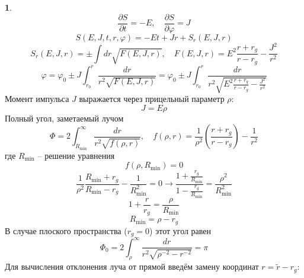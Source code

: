 \documentclass[12pt]{article}
\theoremstyle{definition}
\newtheorem{zad}{}[section]
\begin{document}
\begin{zad}
\begin{equation}
    \frac{\partial S}{\partial t}=-E, \quad \frac{\partial S}{\partial\varphi}=J
\end{equation}
\begin{equation}
    S(E,J,t,r,\varphi)=-Et+Jr+S_r(E,J,r)
\end{equation}
\begin{equation}
    S_r(E,J,r)=\pm\int dr\sqrt{F(E,J,r)},\quad F(E,J,r)=E^2\frac{r+r_g}{r-r_g}-\frac{J^2}{r^2}
\end{equation}
\begin{equation}
    \varphi=\varphi_0\pm J\int_{r_0}^r\frac{dr}{r^2\sqrt{F(E,J,r)}}=\varphi_0\pm J\int_{r_0}^r\frac{dr}{r^2\sqrt{E^2\frac{r+r_g}{r-r_g}-\frac{J^2}{r^2}}}
\end{equation}
Момент импульса $J$ выражается через прицельный параметр $\rho$:
\begin{equation}
    J=E\rho
\end{equation}
Полный угол, заметаемый лучом
\begin{equation}
    \Phi=2\int_{R_\text{min}}^\infty\frac{dr}{r^2\sqrt{f(\rho,r)}},\quad f(\rho,r)=\frac{1}{\rho^2}\left(\frac{r+r_g}{r-r_g}\right)-\frac{1}{r^2}
\end{equation}
где $R_\text{min}$ -- решение уравнения
\begin{equation}
    f(\rho,R_\text{min})=0
\end{equation}
\begin{equation}
    \frac{1}{\rho^2}\frac{R_\text{min}+r_g}{R_\text{min}-r_g}-\frac{1}{R_\text{min}^2}=0\rightarrow \frac{1+\frac{r_g}{R_\text{min}}}{1-\frac{r_g}{R_\text{min}}}=\frac{\rho^2}{R^2_\text{min}}
\end{equation}
\begin{equation}
    1+\frac{r}{r_g}=\frac{\rho}{R_\text{min}}
\end{equation}
\begin{equation}
    R_\text{min}=\rho-r_g
\end{equation}
В случае плоского пространства ($r_g=0$) этот угол равен
\begin{equation}
    \Phi_0=2\int_\rho^\infty\frac{dr}{r^2\sqrt{\rho^{-2}-r^{-2}}}=\pi
\end{equation}
Для вычисления отклонения луча от прямой введём замену координат $r=\tilde r-r_g$:
\begin{multline}

\end{multline}
\end{zad}
\end{document}
